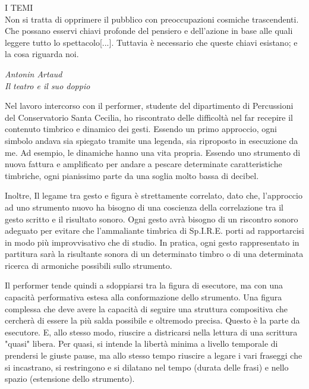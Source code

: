\epigraph{I TEMI \\ Non si tratta di opprimere il pubblico con preoccupazioni cosmiche trascendenti. Che possano esservi chiavi profonde del pensiero e dell'azione in base alle quali leggere tutto lo spettacolo[...]. Tuttavia è necessario che queste chiavi esistano; e la cosa riguarda noi.}{\textit{Antonin Artaud \\ Il teatro e il suo doppio}}

Nel lavoro intercorso con il performer, studente del dipartimento di Percussioni del Conservatorio Santa Cecilia, ho riscontrato delle difficoltà nel far recepire il contenuto timbrico e dinamico dei gesti. Essendo un primo approccio, ogni simbolo andava sia spiegato tramite una legenda, sia riproposto in esecuzione da me. Ad esempio, le dinamiche hanno una vita propria. Essendo uno strumento di nuova fattura e amplificato per andare a pescare determinate caratteristiche timbriche, ogni pianissimo parte da una soglia molto bassa di decibel.

Inoltre, Il legame tra gesto e figura è strettamente correlato, dato che, l'approccio ad uno strumento nuovo ha bisogno di una coscienza della correlazione tra il gesto scritto e il risultato sonoro. Ogni gesto avrà bisogno di un riscontro sonoro adeguato per evitare che l'ammaliante timbrica di Sp.I.R.E. porti ad rapportarcisi in modo più improvvisativo che di studio. In pratica, ogni gesto rappresentato in partitura sarà la risultante sonora di un determinato timbro o di una determinata ricerca di armoniche possibili sullo strumento.

Il performer tende quindi a sdoppiarsi tra la figura di esecutore, ma con una capacità performativa estesa alla conformazione dello strumento. Una figura complessa che deve avere la capacità di seguire una struttura compositiva che cercherà di essere la più salda possibile e oltremodo precisa. Questo è la parte da esecutore. E, allo stesso modo, riuscire a districarsi nella lettura di una scrittura "quasi" libera. Per quasi, si intende la libertà minima a livello temporale di prendersi le giuste pause, ma allo stesso tempo riuscire a legare i vari fraseggi che si incastrano, si restringono e si dilatano nel tempo (durata delle frasi) e nello spazio (estensione dello strumento).
